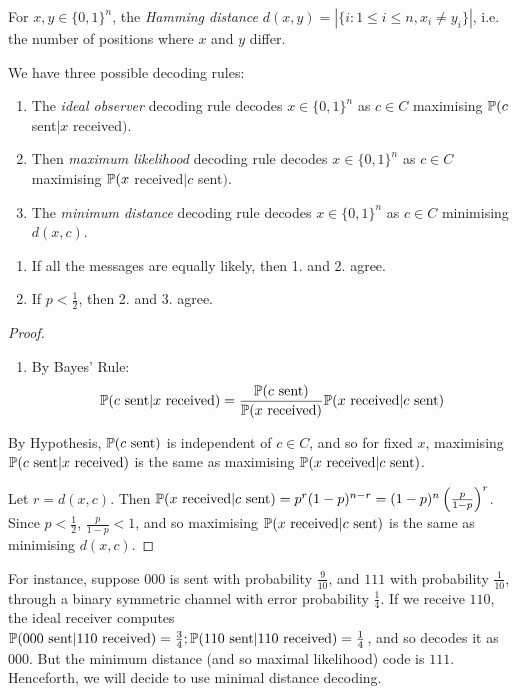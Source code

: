 \documentclass[10pt,a4paper]{article}
\begin{document}
For $x, y \in \{0,1\}^n$, the \emph{Hamming distance} $d(x,y) = |\{i:1\leq i\leq n, x_i \neq y_i \}|$, i.e. the number of positions where $x$ and $y$ differ.

We have three possible decoding rules:
\begin{enumerate}
\item The \emph{ideal observer} decoding rule decodes $x \in \{0,1\}^n$ as $c\in C$ maximising $\P(c$ sent$|x$ received$)$.
\item Then \emph{maximum likelihood} decoding rule decodes $x \in \{0,1\}^n$ as $c\in C$ maximising $\P(x$ received$|c$ sent$)$.
\item The \emph{minimum distance} decoding rule decodes $x \in \{0,1\}^n$ as $c\in C$ minimising $d(x,c)$.
\end{enumerate}

\begin{lemma}
\item
\begin{enumerate}
\item If all the messages are equally likely, then 1. and 2. agree.
\item If $p < \frac{1}{2}$, then 2. and 3. agree.
\end{enumerate}
\end{lemma}
\begin{proof}
\item
\begin{enumerate}
\item By Bayes' Rule:
\begin{align*}
\P(c\sent |x \received) = \frac{\P(c \sent)}{\P(x\received)}\P(x\received|c\sent)
\end{align*}
\end{enumerate}
By Hypothesis, $\P(c\sent)$ is independent of $c \in C$, and so for fixed $x$, maximising $\P(c\sent|x\received)$ is the same as maximising $\P(x\received|c\sent)$.

\item Let $r = d(x,c)$. Then $\P(x\received|c\sent) = p^r(1-p)^{n-r} = (1-p)^n\left(\frac{p}{1-p}\right)^r$. Since $p < \frac12$, $\frac{p}{1-p} < 1$, and so maximising $\P(x\received|c\sent)$ is the same as minimising $d(x, c)$.
\end{proof}

For instance, suppose $000$ is sent with probability $\frac{9}{10}$, and $111$ with probability $\frac{1}{10}$, through a binary symmetric channel with error probability $\frac14$. If we receive $110$, the ideal receiver computes $\P(000\sent|110\received)=\frac34; \P(110\sent|110\received)=\frac14$, and so decodes it as $000$. But the minimum distance (and so maximal likelihood) code is $111$. Henceforth, we will decide to use minimal distance decoding. 
\end{document}
